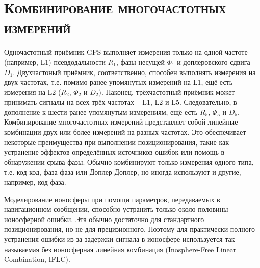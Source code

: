\section{\textsc{Комбинирование многочастотных измерений}}

Одночастотный приёмник GPS выполняет измерения только на одной частоте (например, L1) псевдодальности $R_1$, фазы несущей $\Phi_1$ и доплеровского сдвига $D_1$.
Двухчастоный приёмник, соответственно, способен выполнять измерения на двух частотах, т.е. помимо ранее упомянутых измерений на L1, ещё есть измерения на L2 ($R_2$, $\Phi_2$ и $D_2$).
Наконец, трёхчастотный приёмник может принимать сигналы на всех трёх частотах -- L1, L2 и L5. 
Следовательно, в дополнение к шести ранее упомянутым измерениям, ещё есть $R_5$, $\Phi_5$ и $D_5$. 
Комбинирование многочастотных измерений представляет собой линейные комбинации двух или более измерений на разных частотах.
Это обеспечивает некоторые преимущества при выполнении позиционирования, такие как устранение эффектов определённых источников ошибок или помощь в обнаружении срыва фазы. 
Обычно комбинируют только измерения одного типа, т.е. код-код, фаза-фаза или Доплер-Доплер, но иногда используют и другие, например, код-фаза. 

Моделирование ионосферы при помощи параметров, передаваемых в навигационном сообщении, способно устранить только около половины ионосферной ошибки.
Эта обычно достаточно для стандартного позиционирования, но не для прецизионного.
Поэтому для практически полного устранения ошибки из-за задержки сигнала в ионосфере используется так называемая без ионосферная линейная комбинация (Inosphere-Free Linear Combination, IFLC).

